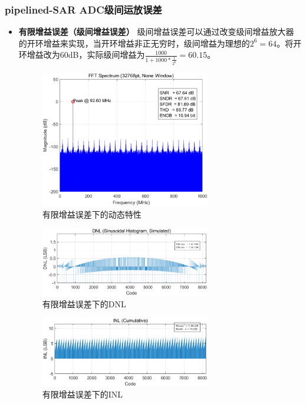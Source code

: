 \documentclass[cs4size,a4paper]{ctexart}
\numberwithin{equation}{section}
\numberwithin{table}{section}
\numberwithin{figure}{section}
\begin{document}
	\subsubsection{pipelined-SAR ADC级间运放误差}
	\begin{itemize}
		\item \textbf{有限增益误差（级间增益误差）} 级间增益误差可以通过改变级间增益放大器的开环增益来实现，当开环增益非正无穷时，级间增益为理想的$2^6=64$。将开环增益改为60dB，实际级间增益为$\frac{1000}{1+1000*\frac{1}{2^6}}=60.15$。
		\begin{figure}[H]
			\centering
			\includegraphics[width=0.7\textwidth]{pic/Av/DFT.png}
			\caption{有限增益误差下的动态特性} 
		\end{figure}

		\begin{figure}[H]
			\centering
			\includegraphics[width=0.7\textwidth]{pic/Av/DNL.png}
			\caption{有限增益误差下的DNL} 
		\end{figure}

		\begin{figure}[H]
			\centering
			\includegraphics[width=0.7\textwidth]{pic/Av/INL.png}
			\caption{有限增益误差下的INL} 
		\end{figure}


\end{itemize}
\end{document}
